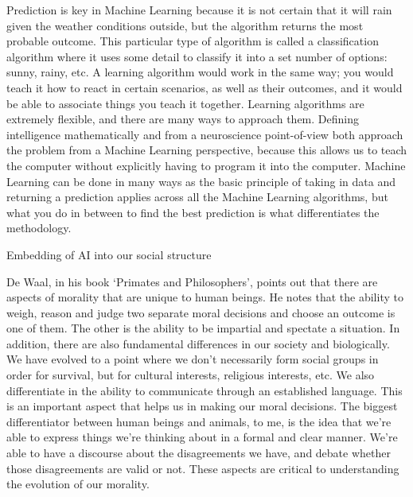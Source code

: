 \documentclass[11pt]{article}
\begin{document}
\par Prediction is key in Machine Learning because it is not certain that it will rain given the weather conditions outside, but the algorithm returns the most probable outcome. This particular type of algorithm is called a classification algorithm where it uses some detail to classify it into a set number of options: sunny, rainy, etc. A learning algorithm would work in the same way; you would teach it how to react in certain scenarios, as well as their outcomes, and it would be able to associate things you teach it together. Learning algorithms are extremely flexible, and there are many ways to approach them. Defining intelligence mathematically and from a neuroscience point-of-view both approach the problem from a Machine Learning perspective, because this allows us to teach the computer without explicitly having to program it into the computer. Machine Learning can be done in many ways as the basic principle of taking in data and returning a prediction applies across all the Machine Learning algorithms, but what you do in between to find the best prediction is what differentiates the methodology. 

\begin{center}
	{\large Embedding of AI into our social structure\par}
\end{center}

\par De Waal, in his book `Primates and Philosophers', points out that there are aspects of morality that are unique to human beings. He notes that the ability to weigh, reason and judge two separate moral decisions and choose an outcome is one of them. The other is the ability to be impartial and spectate a situation. In addition, there are also fundamental differences in our society and biologically. We have evolved to a point where we don't necessarily form social groups in order for survival, but for cultural interests, religious interests, etc. We also differentiate in the ability to communicate through an established language. This is an important aspect that helps us in making our moral decisions. The biggest differentiator between human beings and animals, to me, is the idea that we're able to express things we're thinking about in a formal and clear manner. We're able to have a discourse about the disagreements we have, and debate whether those disagreements are valid or not. These aspects are critical to understanding the evolution of our morality.
\end{document}

